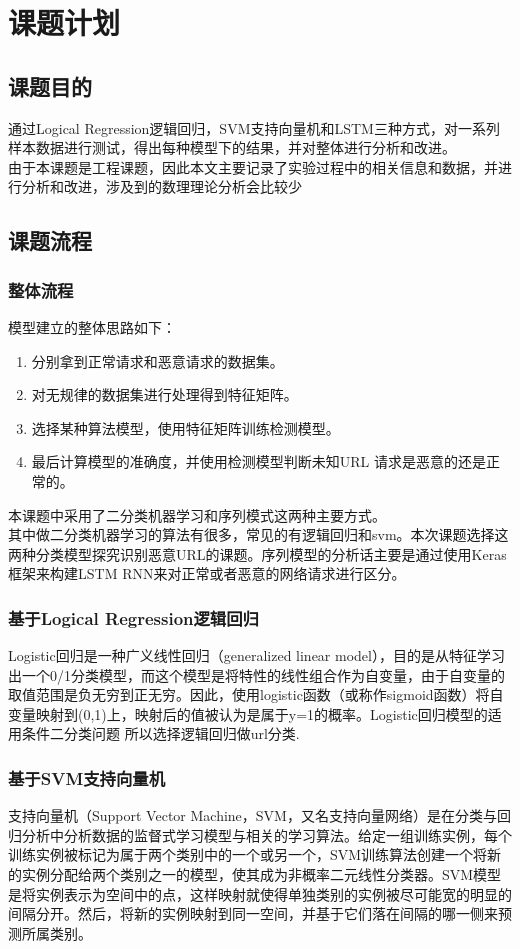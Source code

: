 \section{课题计划}
\subsection{课题目的}
通过Logical Regression逻辑回归，SVM支持向量机和LSTM三种方式，对一系列样本数据进行测试，得出每种模型下的结果，并对整体进行分析和改进。
\\\indent{}由于本课题是工程课题，因此本文主要记录了实验过程中的相关信息和数据，并进行分析和改进，涉及到的数理理论分析会比较少
\subsection{课题流程}
\subsubsection{整体流程}
模型建立的整体思路如下： 
\begin{enumerate}
    \item 分别拿到正常请求和恶意请求的数据集。 
    \item 对无规律的数据集进行处理得到特征矩阵。 
    \item 选择某种算法模型，使用特征矩阵训练检测模型。
    \item 最后计算模型的准确度，并使用检测模型判断未知URL 请求是恶意的还是正常的。
\end{enumerate}
本课题中采用了二分类机器学习和序列模式这两种主要方式。
\\\indent{}其中做二分类机器学习的算法有很多，常见的有逻辑回归和svm。本次课题选择这两种分类模型探究识别恶意URL的课题。序列模型的分析话主要是通过使用Keras框架来构建LSTM RNN来对正常或者恶意的网络请求进行区分。
\subsubsection{基于Logical Regression逻辑回归}
Logistic回归是一种广义线性回归（generalized linear model），目的是从特征学习出一个0/1分类模型，而这个模型是将特性的线性组合作为自变量，由于自变量的取值范围是负无穷到正无穷。因此，使用logistic函数（或称作sigmoid函数）将自变量映射到(0,1)上，映射后的值被认为是属于y=1的概率。Logistic回归模型的适用条件二分类问题 所以选择逻辑回归做url分类.
\subsubsection{基于SVM支持向量机}
支持向量机（Support Vector Machine，SVM，又名支持向量网络）是在分类与回归分析中分析数据的监督式学习模型与相关的学习算法。给定一组训练实例，每个训练实例被标记为属于两个类别中的一个或另一个，SVM训练算法创建一个将新的实例分配给两个类别之一的模型，使其成为非概率二元线性分类器。SVM模型是将实例表示为空间中的点，这样映射就使得单独类别的实例被尽可能宽的明显的间隔分开。然后，将新的实例映射到同一空间，并基于它们落在间隔的哪一侧来预测所属类别。
